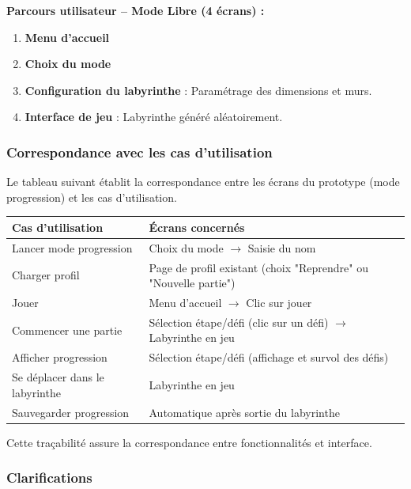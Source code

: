\documentclass{butexFR}
\begin{document}
\textbf{Parcours utilisateur -- Mode Libre (4 écrans) :}

\begin{enumerate}
    \item \textbf{Menu d'accueil}
    \item \textbf{Choix du mode}
    \item \textbf{Configuration du labyrinthe} : Paramétrage des dimensions et murs.
    \item \textbf{Interface de jeu} : Labyrinthe généré aléatoirement.
\end{enumerate}

\subsubsection{Correspondance avec les cas d'utilisation}

Le tableau suivant établit la correspondance entre les écrans du prototype (mode progression) et les cas d'utilisation.

\vspace{1em}
\begin{center}
\begin{tabular}{|p{5cm}|p{8cm}|}
\hline
\textbf{Cas d'utilisation} & \textbf{Écrans concernés} \\
\hline
Lancer mode progression & Choix du mode $\rightarrow$ Saisie du nom \\
\hline
Charger profil & Page de profil existant (choix "Reprendre" ou "Nouvelle partie") \\
\hline
Jouer & Menu d'accueil $\rightarrow$ Clic sur jouer\\
\hline
Commencer une partie & Sélection étape/défi (clic sur un défi) $\rightarrow$ Labyrinthe en jeu \\
\hline
Afficher progression & Sélection étape/défi (affichage et survol des défis) \\
\hline
Se déplacer dans le labyrinthe & Labyrinthe en jeu \\
\hline
Sauvegarder progression & Automatique après sortie du labyrinthe \\
\hline
\end{tabular}
\end{center}
\vspace{1em}

Cette traçabilité assure la correspondance entre fonctionnalités et interface.

\subsubsection{Clarifications}
\end{document}
